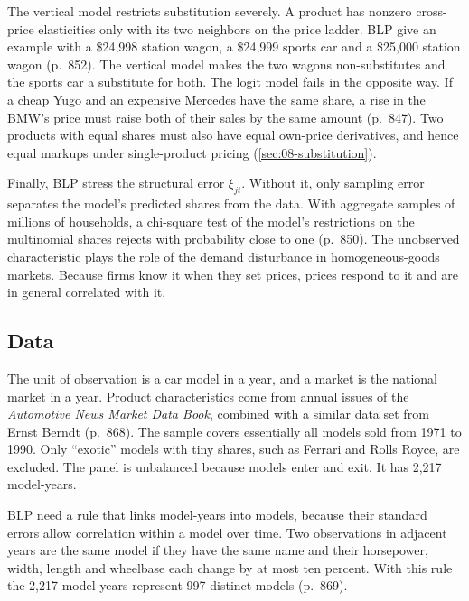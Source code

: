 The vertical model restricts substitution severely. A product has nonzero cross-price elasticities only
with its two neighbors on the price ladder. BLP give an example with a \$24,998 station wagon, a
\$24,999 sports car and a \$25,000 station wagon (p.~852). The vertical model makes the two wagons
non-substitutes and the sports car a substitute for both. The logit model fails in the opposite way.
If a cheap Yugo and an expensive Mercedes have the same share, a rise in the BMW's price must raise
both of their sales by the same amount (p.~847). Two products with equal shares must also have equal
own-price derivatives, and hence equal markups under single-product pricing
(\cref{sec:08-substitution}).

Finally, BLP stress the structural error $\xi_{jt}$. Without it, only sampling error separates the
model's predicted shares from the data. With aggregate samples of millions of households, a
chi-square test of the model's restrictions on the multinomial shares rejects with probability close
to one (p.~850). The unobserved characteristic plays the role of the demand disturbance in
homogeneous-goods markets. Because firms know it when they set prices, prices respond to it and are in
general correlated with it.

\subsection{Data}\label{sec:08-blp95-data}

The unit of observation is a car model in a year, and a market is the national market in a year.
Product characteristics come from annual issues of the \emph{Automotive News Market Data Book},
combined with a similar data set from Ernst Berndt (p.~868). The sample covers essentially all models
sold from 1971 to 1990. Only ``exotic'' models with tiny shares, such as Ferrari and Rolls Royce, are
excluded. The panel is unbalanced because models enter and exit. It has 2,217 model-years.

BLP need a rule that links model-years into models, because their standard errors allow correlation
within a model over time. Two observations in adjacent years are the same model if they have the same
name and their horsepower, width, length and wheelbase each change by at most ten percent. With this
rule the 2,217 model-years represent 997 distinct models (p.~869).

